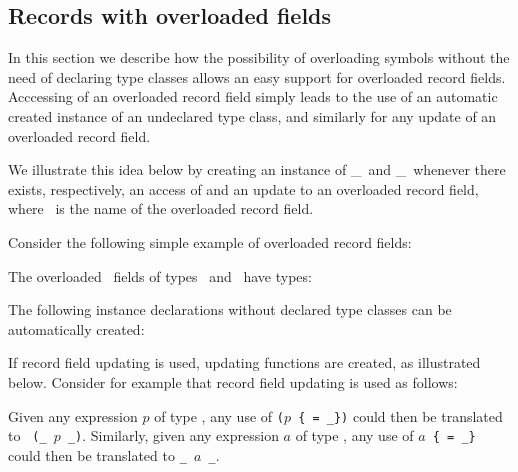 \subsection{Records with overloaded fields}
\label{sec:overloaded-record-fields}

In this section we describe how the possibility of overloading symbols
without the need of declaring type classes allows an easy support for
overloaded record fields. Acccessing of an overloaded record field
simply leads to the use of an automatic created instance of an
undeclared type class, and similarly for any update of an overloaded
record field.

We illustrate this idea below by creating an instance of
\get\_\fieldname\ and \update\_\fieldname\ whenever there exists,
respectively, an access of and an update to an overloaded record
field, where \fieldname\ is the name of the overloaded record field.

Consider the following simple example of overloaded record fields:

\progb{\data\ \Address\ \= = \Address\ \= \{ \id\ :: \Int, \aaddress\ \= :: \String\ \= \kill
\data\ \Person\  \> = \Person\  \> \{ \id\ :: \Int, \name\     \> :: \String\ \>\}\\
\data\ \Address\ \> = \Address\ \> \{ \id\ :: \Int, \aaddress\ \> :: \String\ \>\}
}

The overloaded \id\ fields of types \Person\ and \Address\ have types:

\progb{\id\ :: \Address\ \= \kill
\id\ :: \Person\  \>$\rightarrow$ \Int\\
\id\ :: \Address\ \>$\rightarrow$ \Int
}

The following instance declarations without declared type classes can
be automatically created: 

\progb{
\get\_\id\ :: \Person\ $\rightarrow$ \Int\\
\instance\ \get\_\id\ (\Person\ \id\ \_\ )  = \id\\ \\
\get\_\id\ :: \Address\ $\rightarrow$ \Int\\
\instance\ \get\_\id\ (\Address\ \id\ \_\ ) = \id
}

If record field updating is used, updating functions are created, as
illustrated below. Consider for example that record field updating is
used as follows:

\progb{
\update\_\id\ :: \Person\ $\rightarrow$ \Int\ $\rightarrow$ \Person\\
\instance\ \update\_\id\ (\Person\ \id\ \name) \new\_\id\ = \Person\ \new\_\id\ \name\\ \\
\update\_\id\ :: \Address\ $\rightarrow$ \Int\ $\rightarrow$ \Address\\
\instance\ \update\_\id\ (\Address\ \id\ \aaddress) \new\_\id\ = \Address\ \new\_\id\ \aaddress
}

Given any expression $p$ of type \Person, any use of {\tt ($p$
  \{\id\ = \new\_\id\})} could then be translated to {\tt
  (\update\_\id\ $p$ \new\_\id)}.  Similarly, given any expression $a$
of type \Address, any use of {\tt $a\!$ \{\id\ = \new\_\id\}} could
then be translated to {\tt \update\_\id\ $a$ \new\_\id}.

